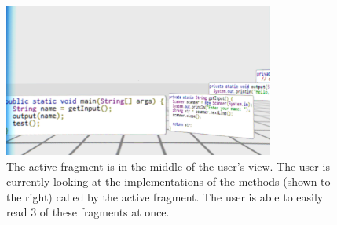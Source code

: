 \documentclass[conference]{IEEEtran}
\begin{document}


\begin{figure}[ht]
\centering
\includegraphics[width=\textwidth,height=5cm]{figures/unwarpped_stack}
\caption{The active fragment is in the middle of the user's view. The user is currently looking at the implementations of the methods (shown to the right) called by the active fragment. The user is able to easily read 3 of these fragments at once.  \label{immersion}}
\end{figure}




\end{document}
